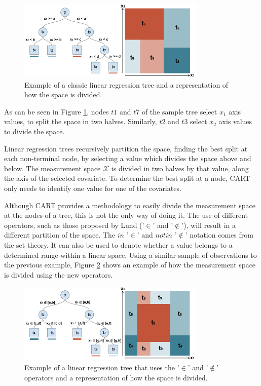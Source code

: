\documentclass[times,twocolumn,final,authoryear]{elsarticle}
\begin{document}
\begin{figure}
  \includegraphics[width=9cm]{fig1_master2.png}
\caption{Example of a classic linear regression tree and a representation of how the space is divided. }
\label{f1}       %
\end{figure}
%
 
As can be seen in Figure \ref{f1}, nodes $t1$ and $t7$ of the sample tree select $x_1$ axis values, to split the space in two halves. Similarly, $t2$ and $t3$ select $x_2$ axis values to divide the space.

Linear regression trees recursively partition the space, finding the best split at each non-terminal node, by selecting a value which divides the space above and below. The measurement space $\mathcal{X}$ is divided in two halves by that value, along the axis of the selected covariate. To determine the best split at a node, CART only needs to identify one value for one of the covariates.

Although CART provides a methodology to easily divide the measurement space at the nodes of a tree, this is not the only way of doing it. The use of different operators, such as those proposed by Lund ('$\in$' and '$\notin$'), will result in a different partition of the space. The $in$ '$\in$' and $not in$ '$\notin$' notation comes from the set theory. It can also be used to denote whether a value belongs to a determined range within a linear space. Using a similar sample of observations to the previous example, Figure \ref{f2} shows an example of how the measurement space is divided using the new operators.

%
\begin{figure}
  \includegraphics[width=9cm]{fig2_master2.png}
\caption{Example of a linear regression tree that uses the '$\in$' and '$\notin$' operators and a representation of how the space is divided.}
\label{f2}       %
\end{figure}
%
\end{document}
